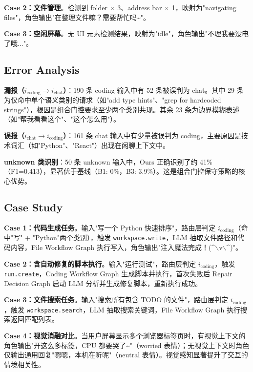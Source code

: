 \textbf{Case 2：文件管理}。检测到 folder $\times$ 3、address bar $\times$ 1，映射为"navigating files"，角色输出"在整理文件嘛？需要帮忙吗\textasciitilde"。

\textbf{Case 3：空闲屏幕}。无 UI 元素检测结果，映射为"idle"，角色输出"不理我要没电了哦..."。

\subsection{Error Analysis}

\textbf{漏报（$i_{\text{coding}} \rightarrow i_{\text{chat}}$）}：190 条 coding 输入中有 52 条被误判为 chat。其中 29 条为仅命中单个语义类别的请求（如"add type hints"、"grep for hardcoded strings"），根因是组合门控要求至少两个类别共现。其余 23 条为边界模糊表述（如"帮我看看这个"、"这个怎么用"）。

\textbf{误报（$i_{\text{chat}} \rightarrow i_{\text{coding}}$）}：161 条 chat 输入中有少量被误判为 coding，主要原因是技术词汇（如"Python"、"React"）出现在闲聊上下文中。

\textbf{unknown 类识别}：50 条 unknown 输入中，Ours 正确识别了约 41\%（F1=0.413），显著优于基线（B1: 0\%，B3: 3.9\%）。这是组合门控保守策略的核心优势。

\subsection{Case Study}

\textbf{Case 1：代码生成任务}。输入"写一个 Python 快速排序"，路由层判定 $i_{\text{coding}}$（命中"写" + "Python"两个类别），触发 \texttt{workspace.write}，LLM 抽取文件路径和代码内容，File Workflow Graph 执行写入，角色输出"注入魔法完成！(\textasciicircum$\backslash$v$\backslash$\textasciicircum)"。

\textbf{Case 2：含自动修复的脚本执行}。输入"运行测试"，路由层判定 $i_{\text{coding}}$，触发 \texttt{run.create}，Coding Workflow Graph 生成脚本并执行，首次失败后 Repair Decision Graph 启动 LLM 分析并生成修复脚本，重新执行成功。

\textbf{Case 3：文件搜索任务}。输入"搜索所有包含 TODO 的文件"，路由层判定 $i_{\text{coding}}$，触发 \texttt{workspace.search}，LLM 抽取搜索关键词，File Workflow Graph 执行搜索返回匹配列表。

\textbf{Case 4：视觉消融对比}。当用户屏幕显示多个浏览器标签页时，有视觉上下文的角色输出"开这么多标签，CPU 都要哭了\textasciitilde"（worried 表情）；无视觉上下文时角色仅输出通用回复"嗯嗯，本机在听呢"（neutral 表情）。视觉感知显著提升了交互的情境相关性。
